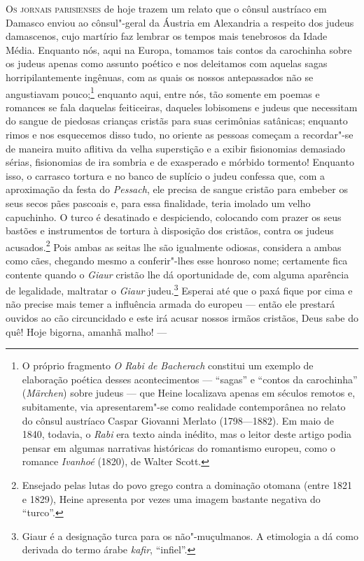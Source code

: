 \textsc{Os jornais parisienses} de hoje trazem um relato que o cônsul austríaco
em Damasco enviou ao cônsul"-geral da Áustria em Alexandria a respeito
dos judeus damascenos, cujo martírio faz lembrar os tempos mais
tenebrosos da Idade Média. Enquanto nós, aqui na Europa, tomamos tais
contos da carochinha sobre os judeus apenas como assunto poético e nos
deleitamos com aquelas sagas horripilantemente ingênuas, com as quais
os nossos antepassados não se angustiavam pouco;\footnote{ O próprio
fragmento\textit{ O Rabi de Bacherach} constitui um exemplo de
elaboração poética desses acontecimentos --- “sagas” e “contos da
carochinha” (\textit{Märchen}) sobre judeus --- que Heine localizava
apenas em séculos remotos e, subitamente, via apresentarem"-se como
realidade contemporânea no relato do cônsul austríaco Caspar Giovanni
Merlato (1798---1882). Em maio de 1840, todavia, o \textit{Rabi} era
texto ainda inédito, mas o leitor deste artigo podia pensar em algumas
narrativas históricas do romantismo europeu, como o romance
\textit{Ivanhoé }(1820), de Walter Scott.} enquanto aqui, entre
nós, tão somente em poemas e romances se fala daquelas feiticeiras,
daqueles lobisomens e judeus que necessitam do sangue de piedosas
crianças cristãs para suas cerimônias satânicas; enquanto rimos e nos
esquecemos disso tudo, no oriente as pessoas começam a recordar"-se de
maneira muito aflitiva da velha superstição e a exibir fisionomias
demasiado sérias, fisionomias de ira sombria e de exasperado e mórbido
tormento! Enquanto isso, o carrasco tortura e no banco de suplício o
judeu confessa que, com a aproximação da festa do \textit{Pessach}, ele
precisa de sangue cristão para embeber os seus secos pães pascoais e,
para essa finalidade, teria imolado um velho capuchinho. O turco é
desatinado e despiciendo, colocando com prazer os seus bastões e
instrumentos de tortura à disposição dos cristãos, contra os judeus
acusados.\footnote{ Ensejado pelas lutas do povo grego contra a
dominação otomana (entre 1821 e 1829), Heine apresenta por vezes uma
imagem bastante negativa do “turco”.} Pois ambas as seitas lhe são
igualmente odiosas, considera a ambas como cães, chegando mesmo a
conferir"-lhes esse honroso nome; certamente fica contente quando o
\textit{Giaur} cristão lhe dá oportunidade de, com alguma aparência de
legalidade, maltratar o\textit{ Giaur} judeu.\footnote{ Giaur é a
designação turca para os não"-muçulmanos. A etimologia a dá como
derivada do termo árabe \textit{kafir}, “infiel”.} Esperai até que
o paxá fique por cima e não precise mais temer a influência armada do
europeu --- então ele prestará ouvidos ao cão circuncidado e este irá
acusar nossos irmãos cristãos, Deus sabe do quê! Hoje bigorna, amanhã
malho! --- 

